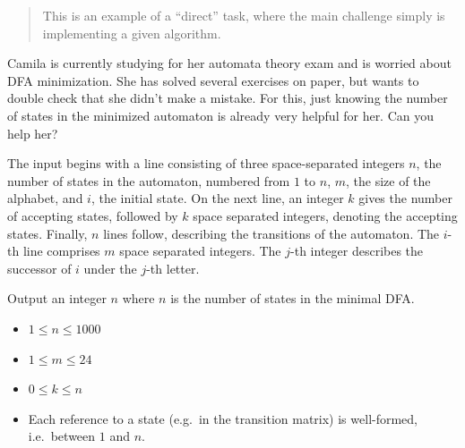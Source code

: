 
\begin{quote}
	This is an example of a \enquote{direct} task, where the main challenge simply is implementing a given algorithm.
\end{quote}

Camila is currently studying for her automata theory exam and is worried about DFA minimization.
She has solved several exercises on paper, but wants to double check that she didn't make a mistake.
For this, just knowing the number of states in the minimized automaton is already very helpful for her.
Can you help her?

\begin{Input}
The input begins with a line consisting of three space-separated integers $n$, the number of states in the automaton, numbered from $1$ to $n$, $m$, the size of the alphabet, and $i$, the initial state.
On the next line, an integer $k$ gives the number of accepting states, followed by $k$ space separated integers, denoting the accepting states.
Finally, $n$ lines follow, describing the transitions of the automaton.
The $i$-th line comprises $m$ space separated integers.
The $j$-th integer describes the successor of $i$ under the $j$-th letter.
\end{Input}

\begin{Output}
Output an integer $n$ where $n$ is the number of states in the minimal DFA.
\end{Output}

\begin{Constraints}
\begin{itemize}
	\item $1 \leq n \leq 1000$
	\item $1 \leq m \leq 24$
	\item $0 \leq k \leq n$
	\item Each reference to a state (e.g.\ in the transition matrix) is well-formed, i.e.\ between $1$ and $n$.
\end{itemize}
\end{Constraints}
